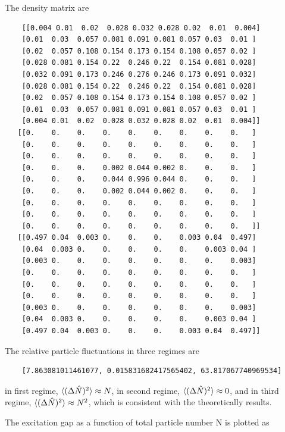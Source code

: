 The density matrix are
\begin{verbatim}
    [[0.004 0.01  0.02  0.028 0.032 0.028 0.02  0.01  0.004]
    [0.01  0.03  0.057 0.081 0.091 0.081 0.057 0.03  0.01 ]
    [0.02  0.057 0.108 0.154 0.173 0.154 0.108 0.057 0.02 ]
    [0.028 0.081 0.154 0.22  0.246 0.22  0.154 0.081 0.028]
    [0.032 0.091 0.173 0.246 0.276 0.246 0.173 0.091 0.032]
    [0.028 0.081 0.154 0.22  0.246 0.22  0.154 0.081 0.028]
    [0.02  0.057 0.108 0.154 0.173 0.154 0.108 0.057 0.02 ]
    [0.01  0.03  0.057 0.081 0.091 0.081 0.057 0.03  0.01 ]
    [0.004 0.01  0.02  0.028 0.032 0.028 0.02  0.01  0.004]]
   [[0.    0.    0.    0.    0.    0.    0.    0.    0.   ]
    [0.    0.    0.    0.    0.    0.    0.    0.    0.   ]
    [0.    0.    0.    0.    0.    0.    0.    0.    0.   ]
    [0.    0.    0.    0.002 0.044 0.002 0.    0.    0.   ]
    [0.    0.    0.    0.044 0.996 0.044 0.    0.    0.   ]
    [0.    0.    0.    0.002 0.044 0.002 0.    0.    0.   ]
    [0.    0.    0.    0.    0.    0.    0.    0.    0.   ]
    [0.    0.    0.    0.    0.    0.    0.    0.    0.   ]
    [0.    0.    0.    0.    0.    0.    0.    0.    0.   ]]
   [[0.497 0.04  0.003 0.    0.    0.    0.003 0.04  0.497]
    [0.04  0.003 0.    0.    0.    0.    0.    0.003 0.04 ]
    [0.003 0.    0.    0.    0.    0.    0.    0.    0.003]
    [0.    0.    0.    0.    0.    0.    0.    0.    0.   ]
    [0.    0.    0.    0.    0.    0.    0.    0.    0.   ]
    [0.    0.    0.    0.    0.    0.    0.    0.    0.   ]
    [0.003 0.    0.    0.    0.    0.    0.    0.    0.003]
    [0.04  0.003 0.    0.    0.    0.    0.    0.003 0.04 ]
    [0.497 0.04  0.003 0.    0.    0.    0.003 0.04  0.497]]
\end{verbatim}

The relative particle fluctuations in three regimes are 
\begin{verbatim}
    [7.863081011461077, 0.015831682417565402, 63.817067740969534]
\end{verbatim}
in first regime, $\braket{(\Delta \hat{N})^2} \approx  N$, in second regime, $\braket{(\Delta \hat{N})^2} \approx 0$, and in third regime, $\braket{(\Delta \hat{N})^2} \approx N^2$, which is consistent with the theoretically results.

The excitation gap as a function of total particle number N is plotted as

